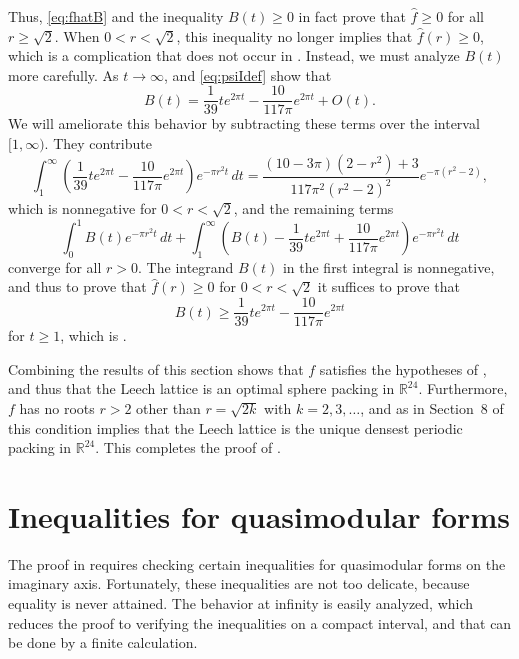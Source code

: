 \documentclass{aomart}
\theoremstyle{plain}
\numberwithin{theorem}{section}
\numberwithin{equation}{section}
\newcommand{\R}{{\mathbb R}}
\begin{document}
Thus, \eqref{eq:fhatB} and the inequality $B(t) \ge 0$ in fact prove that
$\widehat{f} \ge 0$ for all $r \ge \sqrt{2}$. When $0 < r < \sqrt{2}$, this
inequality no longer implies that $\widehat{f}(r) \ge 0$, which is a
complication that does not occur in \cite{V}. Instead, we must analyze $B(t)$
more carefully. As $t \to \infty$,  and
\eqref{eq:psiIdef} show that
\[
B(t) = \frac{1}{39}te^{2\pi t}-\frac{10}{117\pi}e^{2\pi t} + O(t).
\]
We will ameliorate this behavior by subtracting these terms over the
interval $[1,\infty)$. They contribute
\[
\int_1^\infty \left(\frac{1}{39}te^{2\pi t}-\frac{10}{117\pi}e^{2\pi t}\right) e^{-\pi r^2 t} \, dt =
\frac{(10-3\pi)(2-r^2) + 3}{117\pi^2(r^2-2)^2}e^{-\pi(r^2-2)},
\]
which is nonnegative for $0 < r < \sqrt{2}$, and the remaining terms
\[
\int_0^1 B(t) e^{-\pi r^2 t} \, dt + \int_1^\infty \left(B(t) - \frac{1}{39}te^{2\pi t}+\frac{10}{117\pi}e^{2\pi t} \right) e^{-\pi r^2 t} \, dt
\]
converge for all $r>0$.  The integrand $B(t)$ in the first integral is
nonnegative, and thus to prove that $\widehat{f}(r) \ge 0$ for $0 < r <
\sqrt{2}$ it suffices to prove that
\begin{equation} \label{eq:Basymp}
B(t) \ge \frac{1}{39}te^{2\pi t}-\frac{10}{117\pi}e^{2\pi t}
\end{equation}
for $t \ge 1$, which is .

Combining the results of this section shows that $f$ satisfies the hypotheses
of , and thus that the Leech lattice is an optimal
sphere packing in $\R^{24}$.  Furthermore, $f$ has no roots $r>2$ other than
$r=\sqrt{2k}$ with $k=2,3,\dots$, and as in Section~8 of \cite{CE} this
condition implies that the Leech lattice is the unique densest periodic
packing in $\R^{24}$.  This completes the proof of
.

\appendix
\section{Inequalities for quasimodular forms}
\label{app:ineq}

The proof in  requires checking certain
inequalities for quasimod\-ular forms on the imaginary axis. Fortunately,
these inequalities are not too delicate, because equality is never attained.
The behavior at infinity is easily analyzed, which reduces the proof to
verifying the inequalities on a compact interval, and that can be done by a
finite calculation.
\end{document}
